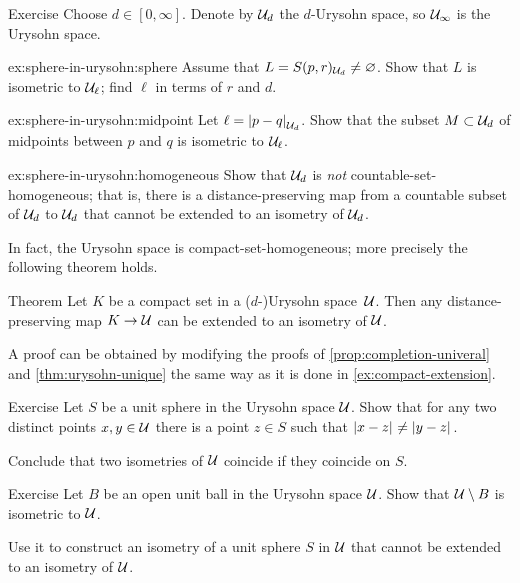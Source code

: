 \begin{thm}{Exercise}\label{ex:sphere-in-urysohn}
Choose $d\in [0,\infty]$.
Denote by $\mathcal{U}_d$ the $d$-Urysohn space,
so $\mathcal{U}_\infty$ is the Urysohn space.

\begin{subthm}{ex:sphere-in-urysohn:sphere}
Assume that $L=S(p,r)_{\mathcal{U}_d}\ne \varnothing$.
Show that $L$ is isometric to $\mathcal{U}_{\ell}$; find $\ell$ in terms of $r$ and $d$.
\end{subthm}

\begin{subthm}{ex:sphere-in-urysohn:midpoint}
Let $\ell=\dist{p}{q}{\spc{U}_d}$.
Show that the subset $M\subset\mathcal{U}_d$ of midpoints between $p$ and $q$ is isometric to $\mathcal{U}_\ell$.
\end{subthm}

\begin{subthm}{ex:sphere-in-urysohn:homogeneous}
Show that $\mathcal{U}_d$ is \emph{not} countable-set-homogeneous;
that is, there is a distance-preserving map from a countable subset of $\mathcal{U}_d$ to $\mathcal{U}_d$ that cannot be extended to an isometry of $\mathcal{U}_d$.
\end{subthm}

\end{thm}

In fact, the Urysohn space is compact-set-homogeneous; more precisely the following theorem holds.

\begin{thm}{Theorem}\label{thm:compact-homogeneous}
Let $K$ be a compact set in a ($d$-)Urysohn space~$\mathcal{U}$.
Then any distance-preserving map $K\to \mathcal{U}$ can be extended to an isometry of $\mathcal{U}$.
\end{thm}

A proof can be obtained by modifying the proofs of \ref{prop:completion-univeral} and \ref{thm:urysohn-unique}
the same way as it is done in \ref{ex:compact-extension}.

\begin{thm}{Exercise}\label{ex:shere}
Let $S$ be a unit sphere in the Urysohn space $\mathcal{U}$.
Show that for any two distinct points $x,y\in \mathcal{U}$ there is a point $z\in S$ such that 
$\dist{x}{z}{}\ne \dist{y}{z}{}$.

Conclude that two isometries of $\mathcal{U}$ coincide if they coincide on $S$.
\end{thm}

\begin{thm}{Exercise}\label{ex:ext(shere)}
Let $B$ be an open unit ball in the Urysohn space $\mathcal{U}$.
Show that $\mathcal{U}\setminus B$ is isometric to $\mathcal{U}$.

Use it to construct an isometry of a unit sphere $S$ in $\mathcal{U}$ that cannot be extended to an isometry of $\mathcal{U}$.
\end{thm}

